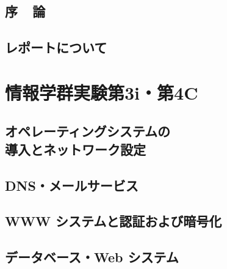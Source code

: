 \documentclass[10pt]{text2002}
\title{}
\author{}
\date{}
\begin{document}
\sloppy
\maketitle
\chapter*{序~~論}\label{chapter:introduction}

\clearpage
\chapter*{レポートについて}\label{chapter:report}


 \tableofcontents
\clearpage


\part{情報学群実験第3i・第4C}\label{part:1}

\chapter[オペレーティングシステムの導入とネットワーク設定]
{オペレーティングシステムの\\導入とネットワーク設定}\label{ch:os}
\def\chapos{01_1_os/}

\def\chapnet{01_1_os/}


\chapter{DNS・メールサービス}\label{ch:dns}
\def\chapdns{01_2_dns_mail/}

\def\chapmail{01_2_dns_mail/}


\chapter{WWW システムと認証および暗号化}
\def\chapwww{02_1_http_auth_crypt/}


\chapter{データベース・Web システム}
\def\chapdb{02_2_database_websystem/}

\end{document}
